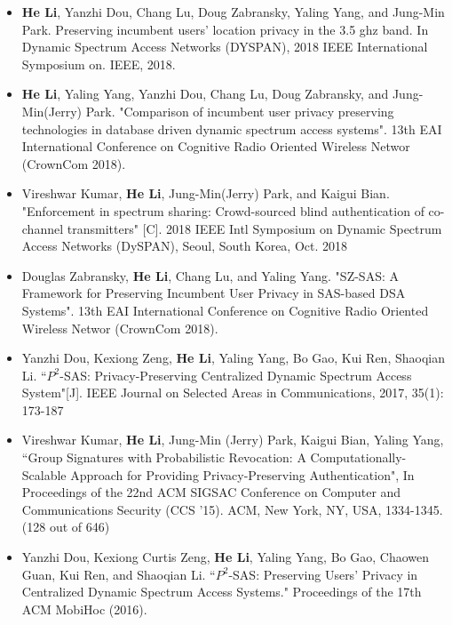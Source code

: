 \documentclass[line,margin]{res}
\begin{document}
\begin{resume}
\begin{itemize}[leftmargin=*]
	\item \textbf{He Li}, Yanzhi Dou, Chang Lu, Doug Zabransky, Yaling Yang, and Jung-Min Park. Preserving incumbent users' location privacy in the 3.5 ghz band. In Dynamic Spectrum Access Networks (DYSPAN), 2018 IEEE International Symposium on. IEEE, 2018.
	
	\item \textbf{He Li}, Yaling Yang, Yanzhi Dou, Chang Lu, Doug Zabransky, and Jung-Min(Jerry) Park. "Comparison of incumbent user privacy preserving technologies in database driven dynamic spectrum access systems". 13th EAI International Conference on Cognitive Radio Oriented Wireless Networ (CrownCom 2018).

	\item Vireshwar Kumar, \textbf{He Li}, Jung-Min(Jerry) Park, and Kaigui Bian. "Enforcement in spectrum sharing: Crowd-sourced blind authentication of co-channel transmitters" [C]. 2018 IEEE Intl Symposium on Dynamic Spectrum Access Networks (DySPAN), Seoul, South Korea, Oct. 2018

	\item Douglas Zabransky, \textbf{He Li}, Chang Lu, and Yaling Yang. "SZ-SAS: A Framework for Preserving Incumbent User Privacy in SAS-based DSA Systems". 13th EAI International Conference on Cognitive Radio Oriented Wireless Networ (CrownCom 2018).

				\item Yanzhi Dou, Kexiong Zeng, \textbf{He Li}, Yaling Yang, Bo Gao, Kui Ren, Shaoqian Li. ``$ P^{2} $-SAS: Privacy-Preserving Centralized Dynamic Spectrum Access System"[J]. IEEE Journal on Selected Areas in Communications, 2017, 35(1): 173-187
					

                 \item Vireshwar Kumar, \textbf{He Li}, Jung-Min (Jerry) Park, Kaigui Bian, Yaling Yang, ``Group Signatures with Probabilistic Revocation: A Computationally-Scalable Approach for Providing Privacy-Preserving Authentication",  In Proceedings of the 22nd ACM SIGSAC Conference on Computer and Communications Security (CCS '15). ACM, New York, NY, USA, 1334-1345. (128 out of 646)
                \item Yanzhi Dou, Kexiong Curtis Zeng, \textbf{He Li}, Yaling Yang, Bo Gao, Chaowen Guan, Kui Ren, and Shaoqian Li. ``$P^2$-SAS: Preserving Users' Privacy in Centralized Dynamic Spectrum Access Systems." Proceedings of the 17th ACM MobiHoc (2016).


                \end{itemize}                  
 


\end{resume}
\end{document}
